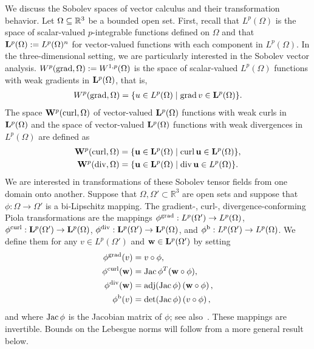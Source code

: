 \documentclass[10pt,letterpaper]{article}
\begin{document}
We discuss the Sobolev spaces of vector calculus and their transformation behavior. 
Let $\Omega \subseteq {\mathbb R}^{3}$ be a bounded open set. 
First, recall that $L^{p}(\Omega)$ is the space of scalar-valued $p$-integrable functions defined on $\Omega$
and that ${\mathbf L}^{p}(\Omega) := L^{p}(\Omega)^{n}$ for vector-valued functions with each component in $L^{p}(\Omega)$. 
In the three-dimensional setting, we are particularly interested in the Sobolev vector analysis. 
$W^{p}(\operatorname{grad},\Omega) := W^{1,p}(\Omega)$ is the space of scalar-valued $L^{p}(\Omega)$ functions with weak gradients in ${\mathbf L}^{p}(\Omega)$, that is,  
\begin{gather*}
    W^{p}(\grad,\Omega) = \{ u \in L^{p}(\Omega) \suchthat \grad v \in \bfL^{p}(\Omega) \}
    .
\end{gather*}
The space ${\mathbf W}^{p}(\operatorname{curl},\Omega)$ of vector-valued ${\mathbf L}^{p}(\Omega)$ functions with weak curls in ${\mathbf L}^{p}(\Omega)$
and the space of vector-valued ${\mathbf L}^{p}(\Omega)$ functions with weak divergences in $L^{p}(\Omega)$ are defined as 
\begin{gather*}
    \bfW^{p}(\curl,\Omega) = \{ \bfu \in \bfL^{p}(\Omega) \suchthat \curl \bfu \in \bfL^{p}(\Omega) \},
    \\ 
    \bfW^{p}(\divergence,\Omega) = \{ \bfu \in \bfL^{p}(\Omega) \suchthat \divergence \bfu \in L^{p}(\Omega) \}.
\end{gather*}
We are interested in transformations of these Sobolev tensor fields from one domain onto another. 
Suppose that $\Omega, \Omega' \subset \mathbb{R}^3$ are open sets and suppose that $\phi: \Omega \to \Omega'$ is a bi-Lipschitz mapping.
The gradient-, curl-, divergence-conforming Piola transformations are the mappings 
$\phi^{\operatorname{grad}}: L^{p}(\Omega') \to L^{p}(\Omega)$,
$\phi^{\operatorname{curl}}: {\mathbf L}^{p}(\Omega') \to {\mathbf L}^{p}(\Omega)$, 
$\phi^{\operatorname{div}}: {\mathbf L}^{p}(\Omega') \to {\mathbf L}^{p}(\Omega)$,
and
$\phi^{\rm b}: L^{p}(\Omega') \to L^{p}(\Omega)$. 
We define them 
for any $v \in L^{p}(\Omega')$ and ${\mathbf w} \in {\mathbf L}^{p}(\Omega')$ by setting 
\begin{subequations}\label{eq_definition_piola}
\begin{align*}
    \phi^{\operatorname{grad}}(v) &= v \circ \phi, \\
    \phi^{\operatorname{curl}}({\mathbf w}) &= \operatorname{{\rm Jac}}\phi^{T} ({\mathbf w} \circ \phi), \\
    \phi^{\operatorname{div}}({\mathbf w}) &= \operatorname{adj}(\operatorname{{\rm Jac}}\phi) \left( {\mathbf w} \circ \phi \right), \\  
    \phi^{\rm b}(v) &= \det(\operatorname{{\rm Jac}}\phi) \left( v \circ \phi \right),
\end{align*}
\end{subequations}
and where $\operatorname{{\rm Jac}}\phi$ is the Jacobian matrix of $\phi$; see also~\cite[Definition~9.8]{ern2021finite}.
These mappings are invertible. 
Bounds on the Lebesgue norms will follow from a more general result below. 
\end{document}
